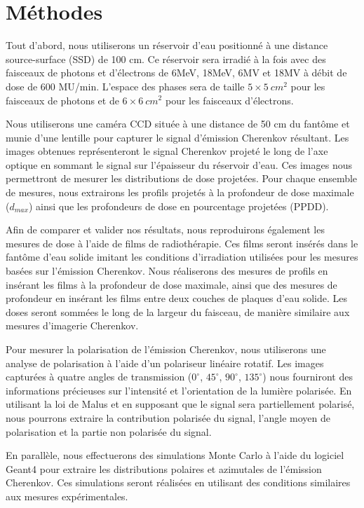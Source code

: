 \documentclass{Thesis}
\begin{document}
\section*{Méthodes}
Tout d'abord, nous utiliserons un réservoir d'eau positionné à une distance source-surface (SSD) de 100 cm.
Ce réservoir sera irradié à la fois avec des faisceaux de photons et d'électrons de 6MeV, 18MeV, 6MV et 18MV à débit de dose de 600 MU/min.
L'espace des phases sera de taille $5 \times \SI{5}{cm^2}$ pour les faisceaux de photons et de $6 \times \SI{6}{cm^2}$ pour les faisceaux d'électrons.

Nous utiliserons une caméra CCD située à une distance de 50 cm du fantôme et munie d'une lentille pour capturer le signal d'émission Cherenkov résultant.
Les images obtenues représenteront le signal Cherenkov projeté le long de l'axe optique en sommant le signal sur l'épaisseur du réservoir d'eau.
Ces images nous permettront de mesurer les distributions de dose projetées.
Pour chaque ensemble de mesures, nous extrairons les profils projetés à la profondeur de dose maximale ($d_{max}$) ainsi que les profondeurs de dose en pourcentage projetées (PPDD).

Afin de comparer et valider nos résultats, nous reproduirons également les mesures de dose à l'aide de films de radiothérapie.
Ces films seront insérés dans le fantôme d'eau solide imitant les conditions d'irradiation utilisées pour les mesures basées sur l'émission Cherenkov.
Nous réaliserons des mesures de profils en insérant les films à la profondeur de dose maximale, ainsi que des mesures de profondeur en insérant les films entre deux couches de plaques d'eau solide.
Les doses seront sommées le long de la largeur du faisceau, de manière similaire aux mesures d'imagerie Cherenkov.

Pour mesurer la polarisation de l'émission Cherenkov, nous utiliserons une analyse de polarisation à l'aide d'un polariseur linéaire rotatif.
Les images capturées à quatre angles de transmission ($0^\circ$, $45^\circ$, $90^\circ$, $135^\circ$) nous fourniront des informations précieuses sur l'intensité et l'orientation de la lumière polarisée.
En utilisant la loi de Malus et en supposant que le signal sera partiellement polarisé, nous pourrons extraire la contribution polarisée du signal, l'angle moyen de polarisation et la partie non polarisée du signal.

En parallèle, nous effectuerons des simulations Monte Carlo à l'aide du logiciel Geant4 pour extraire les distributions polaires et azimutales de l'émission Cherenkov.
Ces simulations seront réalisées en utilisant des conditions similaires aux mesures expérimentales.
\end{document}

